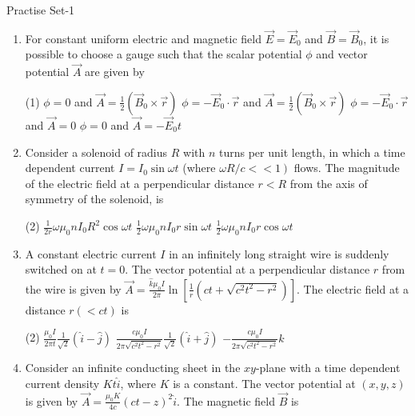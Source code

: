 \newpage
\begin{abox}
Practise Set-1
\end{abox}
\begin{enumerate}
	\item  For constant uniform electric and magnetic field $\vec{E}=\vec{E}_{0}$ and $\vec{B}=\vec{B}_{0}$, it is possible to choose a gauge such that the scalar potential $\phi$ and vector potential $\vec{A}$ are given by
		{}
		\begin{tasks}(1)
			\task[\textbf{A.}] $\phi=0$ and $\vec{A}=\frac{1}{2}\left(\vec{B}_{0} \times \vec{r}\right)$
			\task[\textbf{B.}] $\phi=-\vec{E}_{0} \cdot \vec{r}$ and $\vec{A}=\frac{1}{2}\left(\vec{B}_{0} \times \vec{r}\right)$
			\task[\textbf{C.}]  $\phi=-\vec{E}_{0} \cdot \vec{r}$ and $\vec{A}=0$
			\task[\textbf{D.}] $\phi=0$ and $\vec{A}=-\vec{E}_{0} t$
		\end{tasks}
	\item	Consider a solenoid of radius $R$ with $n$ turns per unit length, in which a time dependent current $I=I_{0} \sin \omega t$ (where $\left.\omega R / c<<1\right)$ flows. The magnitude of the electric field at a perpendicular distance $r<R$ from the axis of symmetry of the solenoid, is
		{\exyear{NET/JRF(DEC-2011)}}
		\begin{tasks}(2)
			\task[\textbf{A.}]  0
			\task[\textbf{B.}] $\frac{1}{2 r} \omega \mu_{0} n I_{0} R^{2} \cos \omega t$
			\task[\textbf{C.}] $\frac{1}{2} \omega \mu_{0} n I_{0} r \sin \omega t$
			\task[\textbf{D.}]  $\frac{1}{2} \omega \mu_{0} n I_{0} r \cos \omega t$
		\end{tasks}
\item	A constant electric current $I$ in an infinitely long straight wire is suddenly switched on at $t=0$. The vector potential at a perpendicular distance $r$ from the wire is given by $\vec{A}=\frac{\hat{k} \mu_{0} I}{2 \pi} \ln \left[\frac{1}{r}\left(c t+\sqrt{c^{2} t^{2}-r^{2}}\right)\right]$. The electric field at a distance $r(<c t)$ is
		{}
		\begin{tasks}(2)
			\task[\textbf{B.}] $\frac{\mu_{0} I}{2 \pi t} \frac{1}{\sqrt{2}}(\hat{i}-\hat{j})$
			\task[\textbf{C.}] $\frac{c \mu_{0} I}{2 \pi \sqrt{c^{2} t^{2}-r^{2}}} \frac{1}{\sqrt{2}}(\hat{i}+\hat{j})$
			\task[\textbf{D.}] $-\frac{c \mu_{0} I}{2 \pi \sqrt{c^{2} t^{2}-r^{2}}} \hat{k}$
		\end{tasks}
\item Consider an infinite conducting sheet in the $x y$-plane with a time dependent current density $K t \hat{i}$, where $K$ is a constant. The vector potential at $(x, y, z)$ is given by $\vec{A}=\frac{\mu_{0} K}{4 c}(c t-z)^{2} \hat{i}$. The magnetic field $\vec{B}$ is

\end{enumerate}
